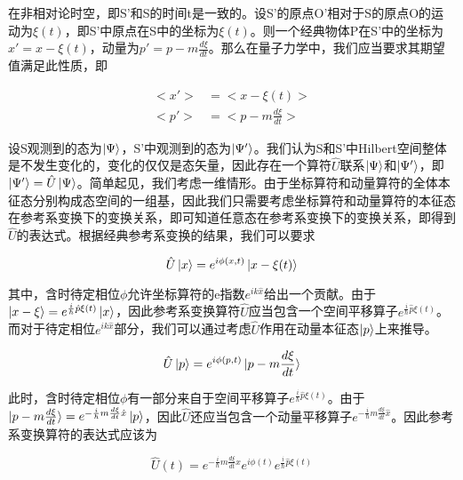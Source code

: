 \documentclass[a4paper]{article}
\begin{document}
        在非相对论时空，即S'和S的时间t是一致的。设S'的原点O'相对于S的原点O的运动为$\xi(t)$，即S'中原点在S中的坐标为$\xi(t)$。则一个经典物体P在S'中的坐标为$x'=x-\xi(t)$，动量为$p'=p-m\frac{d\xi}{dt}$。那么在量子力学中，我们应当要求其期望值满足此性质，即
    
        \begin{equation}
            \begin{split}
                <x'>&=<x-\xi(t)>      \\
                <p'>&=<p-m\frac{d\xi}{dt}>
            \end{split}
        \end{equation}
    
        设S观测到的态为$\ket{\Psi}$，S'中观测到的态为$\ket{\Psi'}$。我们认为S和S'中Hilbert空间整体是不发生变化的，变化的仅仅是态矢量，因此存在一个算符$\hat{U}$联系$\ket{\Psi}$和$\ket{\Psi'}$，即$\ket{\Psi'}=\hat{U}\ket{\Psi}$。简单起见，我们考虑一维情形。由于坐标算符和动量算符的全体本征态分别构成态空间的一组基，因此我们只需要考虑坐标算符和动量算符的本征态在参考系变换下的变换关系，即可知道任意态在参考系变换下的变换关系，即得到$\hat{U}$的表达式。根据经典参考系变换的结果，我们可以要求

        \begin{equation}
            \hat{U}\ket{x}=e^{i\phi(x,t)}\ket{x-\xi(t)}
        \end{equation}

        其中，含时待定相位$\phi$允许坐标算符的e指数$e^{ik\hat{x}}$给出一个贡献。由于$\ket{x-\xi}=e^{\frac{i}{\hbar}\hat{p}\xi(t)}\ket{x}$，因此参考系变换算符$\hat{U}$应当包含一个空间平移算子$e^{\frac{i}{\hbar}\hat{p}\xi(t)}$。而对于待定相位$e^{ik\hat{x}}$部分，我们可以通过考虑$\hat{U}$作用在动量本征态$\ket{p}$上来推导。

        \begin{equation}
            \hat{U}\ket{p}=e^{i\phi(p,t)}\ket{p-m\frac{d\xi}{dt}}
        \end{equation}

        此时，含时待定相位$\phi$有一部分来自于空间平移算子$e^{\frac{i}{\hbar}\hat{p}\xi(t)}$。由于$\ket{p-m\frac{d\xi}{dt}}=e^{-\frac{i}{\hbar}m\frac{d\xi}{dt}\hat{x}}\ket{p}$，因此$\hat{U}$还应当包含一个动量平移算子$e^{-\frac{i}{\hbar}m\frac{d\xi}{dt}\hat{x}}$。因此参考系变换算符的表达式应该为

        \begin{equation}\label{Utmp}
            \hat{U}(t)=e^{-\frac{i}{\hbar}m\frac{d\xi}{dt}\hat{x}}e^{i\phi(t)} e^{\frac{i}{\hbar}\hat{p}\xi(t)}
        \end{equation}
\end{document}

